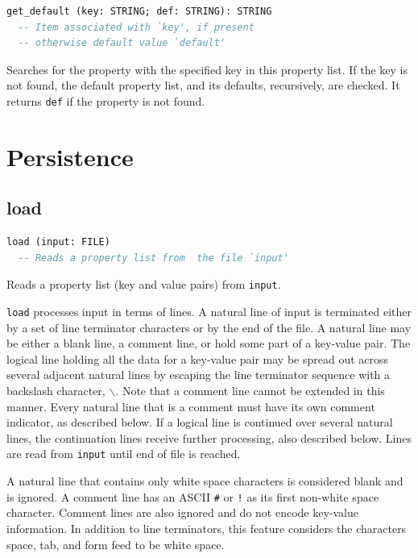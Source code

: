\documentclass[a4paper,fleqn]{report}
\begin{document}
\begin{lstlisting}[language=Eiffel]
get_default (key: STRING; def: STRING): STRING
  -- Item associated with `key', if present
  -- otherwise default value `default'
\end{lstlisting}

Searches for the property with the specified key in this property
list. If the key is not found, the default property list, and its
defaults, recursively, are checked. It returns \texttt{def} if the
property is not found.


\section{Persistence}
\label{sec:persistence}


\subsection{load}
\label{sec:load}

\begin{lstlisting}[language=Eiffel]
load (input: FILE)
  -- Reads a property list from  the file `input'
\end{lstlisting}

Reads a property list (key and value pairs) from \texttt{input}.

\texttt{load} processes input in terms of lines. A natural line of
input is terminated either by a set of line terminator characters or
by the end of the file. A natural line may be either a blank line, a
comment line, or hold some part of a key-value pair. The logical line
holding all the data for a key-value pair may be spread out across
several adjacent natural lines by escaping the line terminator
sequence with a backslash character, \texttt{$\backslash$}. Note that
a comment line cannot be extended in this manner. Every natural line
that is a comment must have its own comment indicator, as described
below. If a logical line is continued over several natural lines, the
continuation lines receive further processing, also described below.
Lines are read from \texttt{input} until end of file is reached.

A natural line that contains only white space characters is considered
blank and is ignored. A comment line has an ASCII \texttt{\#} or
\texttt{!} as its first non-white space character. Comment lines are
also ignored and do not encode key-value information. In addition to
line terminators, this feature considers the characters space, tab,
and form feed to be white space.
\end{document}
